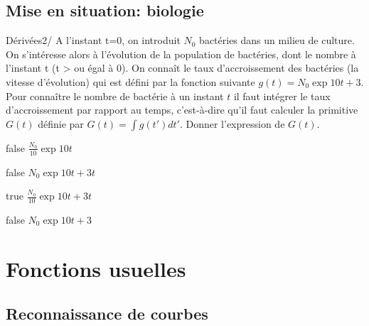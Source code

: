 \documentclass[11pt]{article}
\begin{document}
        \subsection{Mise en situation: biologie}
            \begin{question}{22}{Dérivées}{2}{/}
			 A l'instant t=0, on introduit $N_0$ bactéries dans un milieu de culture. On s'intéresse alors à l'évolution de la population de bactéries, dont le nombre à l'instant t (t > ou égal à 0). On connaît le taux d'accroissement des bactéries (la vitesse d'évolution) qui est défini par la fonction suivante $g(t) = N_0 \exp{10t}+3$. Pour connaître le nombre de bactérie à un instant $t$ il faut intégrer le taux d'accroissement par rapport au temps, c'est-à-dire qu'il faut calculer la primitive $G(t)$ définie par $G(t)= \int g(t')dt'$. Donner l'expression de $G(t)$.
            \end{question}

            \begin{reponses}
            	\item[false]   $\frac{N_0}{10}\exp{10t} $
            	\item[false]   $N_0\exp{10t} +3t $
                \item[true]   $\frac{N_0}{10}\exp{10t} +3t $
                \item[false]   $N_0\exp{10t} +3 $
            \end{reponses}
			   
			
	\section{Fonctions usuelles}
	
	    \subsection{Reconnaissance de courbes}
			
\end{document}
